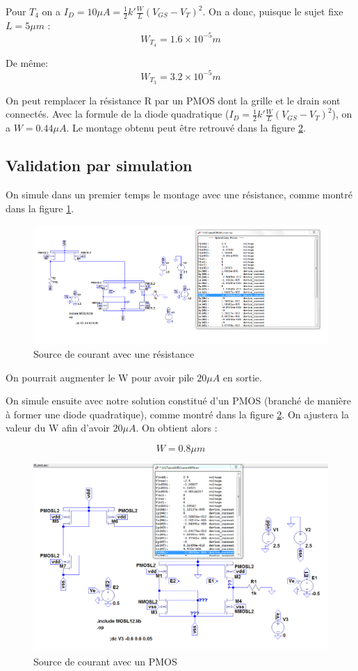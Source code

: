 \documentclass[french]{article}
\begin{document}
Pour $T_4$ on a $I_D = 10 \mu A = \frac{1}{2} k' \frac{W}{L} (V_{GS} - V_T)^2$. On a donc, puisque le sujet fixe $L=5 \mu m$ :
\[
\boxed{W_{T_4} = 1.6 \times 10^{-5} m}
\]

De même:
\[
\boxed{W_{T_3} = 3.2 \times 10^{-5} m}
\]

On peut remplacer la résistance R par un PMOS dont la grille et le drain sont connectés. Avec la formule de la diode quadratique ($I_D = \frac{1}{2} k' \frac{W}{L} (V_{GS} - V_T)^2$), on a $W = 0.44 \mu A$. Le montage obtenu peut être retrouvé dans la figure \ref{sourceP}.

\subsection{ Validation par simulation}

On simule dans un premier temps le montage avec une résistance, comme montré dans la figure \ref{sourceRes}.

\begin{figure}[h!]
\includegraphics[width=\textwidth]{images/SourceCourrant.PNG}
\caption{Source de courant avec une résistance}
\label{sourceRes}
\end{figure}

On pourrait augmenter le W pour avoir pile $20 \mu A$ en sortie.

On simule ensuite avec notre solution constitué d'un PMOS (branché de manière à former une diode quadratique), comme montré dans la figure \ref{sourceP}. On ajustera la valeur du W afin d'avoir $20 \mu A$. On obtient alors :

\[
\boxed{W = 0.8 \mu m}
\]

\begin{figure}[h!]
\includegraphics[width=\textwidth]{images/SourceNPN.PNG}
\caption{Source de courant avec un PMOS}
\label{sourceP}
\end{figure}
\end{document}
